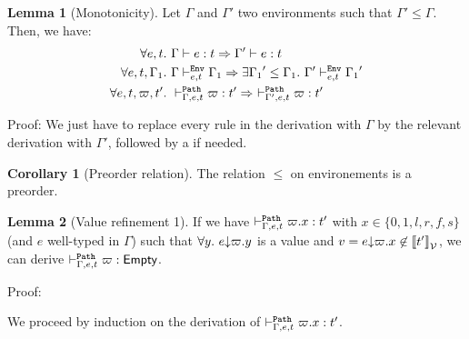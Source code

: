 \documentclass[a4paper]{article}
\theoremstyle{definition}
\newtheorem{lemma}{Lemma}
\newtheorem{corollary}{Corollary}
\begin{document}
        \begin{lemma}[Monotonicity]
          Let $\Gamma$ and $\Gamma'$ two environments such that $\Gamma' \leq \Gamma$.
          Then, we have:
          \begin{align*}
            \forall e,t.\ &\Gamma \vdash e:t \Rightarrow \Gamma' \vdash e:t\\
            \forall e,t,\Gamma_1.\ &\Gamma \vdash^{\texttt{Env}}_{e,t} \Gamma_1 \Rightarrow \exists {\Gamma_1}'\leq \Gamma_1.\ \Gamma' \vdash^{\texttt{Env}}_{e,t} {\Gamma_1}'\\
            \forall e,t,\varpi,t'.\ &\vdash^{\texttt{Path}}_{\Gamma,e,t} \varpi:t' \Rightarrow\ \vdash^{\texttt{Path}}_{\Gamma',e,t} \varpi:t'
          \end{align*}
        \end{lemma}
        Proof: We just have to replace every  rule in the derivation with $\Gamma$
        by the relevant derivation with $\Gamma'$, followed by a  if needed.

        \begin{corollary}[Preorder relation]
          The relation $\leq$ on environements is a preorder.
        \end{corollary}

        \begin{lemma}[Value refinement 1]
          If we have $\vdash^{\texttt{Path}}_{\Gamma,e,t} \varpi.x:t'$ with $x\in\{0,1,l,r,f,s\}$ (and $e$ well-typed in $\Gamma$) such that $\forall y.\ e{\downarrow}\varpi.y$ is a value
          and $v = e{\downarrow}\varpi.x \not\in {\llbracket t' \rrbracket}_{\mathcal{V}}$, we can derive $\vdash^{\texttt{Path}}_{\Gamma,e,t} \varpi:\textsf{Empty}$.
        \end{lemma}

        Proof:

        We proceed by induction on the derivation of $\vdash^{\texttt{Path}}_{\Gamma,e,t} \varpi.x:t'$.
\end{document}
